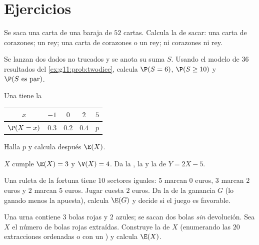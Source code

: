 \section{Ejercicios}

\begin{exercise}[$\star$]\label{exo:g11:prob:1}
Se saca una carta de una baraja de $52$ cartas. Calcula la  de
sacar: una carta de corazones; un rey; una carta de corazones o un rey; ni
corazones ni rey.
\end{exercise}

\begin{exercise}[$\star$]\label{exo:g11:prob:2}
Se lanzan dos dados no trucados y se anota su suma $S$. Usando el modelo
de $36$ resultados del \cref{ex:g11:prob:twodice}, calcula $\P(S = 6)$,
$\P(S \geq 10)$ y $\P(S \text{ es par})$.
\end{exercise}

\begin{exercise}[$\star$]\label{exo:g11:prob:3}
Una  tiene la 
\begin{center}
\begin{tabular}{c|cccc}
$x$ & $-1$ & $0$ & $2$ & $5$\\
\hline
$\P(X=x)$ & $0.3$ & $0.2$ & $0.4$ & $p$
\end{tabular}
\end{center}
Halla $p$ y calcula después $\E(X)$.
\end{exercise}

\begin{exercise}[$\star$]\label{exo:g11:prob:4}
$X$ cumple $\E(X) = 3$ y $\V(X) = 4$. Da la , la  y la
 de $Y = 2X - 5$.
\end{exercise}

\begin{exercise}[$\star\star$]\label{exo:g11:prob:5}
Una ruleta de la fortuna tiene $10$ sectores iguales: $5$ marcan $0$
euros, $3$ marcan $2$ euros y $2$ marcan $5$ euros. Jugar cuesta $2$
euros. Da la  de la ganancia $G$ (lo ganado menos la apuesta),
calcula $\E(G)$ y decide si el juego es favorable.
\end{exercise}

\begin{exercise}[$\star\star$]\label{exo:g11:prob:6}
Una urna contiene $3$ bolas rojas y $2$ azules; se sacan dos bolas
\emph{sin} devolución. Sea $X$ el número de bolas rojas extraídas.
Construye la  de $X$ (enumerando las $20$ extracciones
ordenadas o con un ) y calcula $\E(X)$.
\end{exercise}

